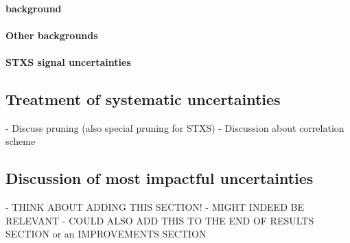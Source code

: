 





\paragraph{\Ztautau background}




\paragraph{Other backgrounds}


\paragraph{STXS signal uncertainties}



\subsection{Treatment of systematic uncertainties}
- Discuss pruning (also special pruning for STXS)
- Discussion about correlation scheme


\subsection{Discussion of most impactful uncertainties}

- THINK ABOUT ADDING THIS SECTION!
- MIGHT INDEED BE RELEVANT 
- COULD ALSO ADD THIS TO THE END OF RESULTS SECTION or an IMPROVEMENTS SECTION
